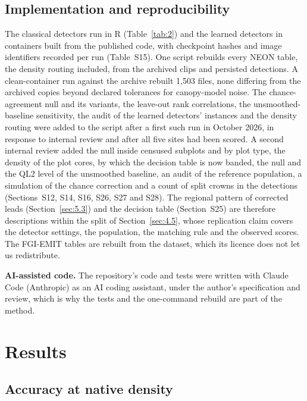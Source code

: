 \documentclass[preprint,12pt,authoryear,a4paper]{elsarticle}
\begin{document}
\subsection{Implementation and reproducibility}\label{sec:4.7}

The classical detectors run in R (Table~\ref{tab:2}) and the learned detectors in
containers built from the published code, with checkpoint hashes and image
identifiers recorded per run (Table~S15). One script rebuilds every NEON table,
the density routing included, from the archived clips and persisted detections.
A clean-container run against the archive rebuilt 1,503 files, none differing
from the archived copies beyond declared tolerances for canopy-model noise. The
chance-agreement null and its variants, the leave-out rank correlations, the
unsmoothed-baseline sensitivity, the audit of the learned detectors' instances
and the density routing were added to the script after a first such run in
October 2026, in response to internal review and after all five sites had been
scored. A second internal review added the null inside censused subplots and by
plot type, the density of the plot cores, by which the decision table is now
banded, the null and the QL2 level of the unsmoothed baseline, an audit of the
reference population, a simulation of the chance correction and a count of split
crowns in the detections (Sections~S12, S14, S16, S26, S27 and S28). The
regional pattern of corrected leads (Section~\ref{sec:5.3}) and the decision table
(Section~S25) are therefore descriptions within the split of Section~\ref{sec:4.5}, whose
replication claim covers the detector settings, the population, the matching
rule and the observed scores. The FGI-EMIT tables are rebuilt from the dataset,
which its licence does not let us redistribute.

\textbf{AI-assisted code.} The repository's code and tests were written with Claude
Code (Anthropic) as an AI coding assistant, under the author's specification and
review, which is why the tests and the one-command rebuild are part of the
method.

\section{Results}\label{sec:5}

\subsection{Accuracy at native density}\label{sec:5.1}
\end{document}
